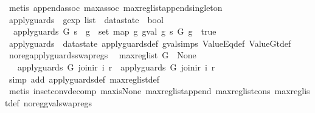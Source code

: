 \begin{isabellebody}
\ {\isacharparenleft}metis\ append{\isacharunderscore}assoc\ max{\isachardot}assoc\ max{\isacharunderscore}reg{\isacharunderscore}list{\isacharunderscore}append{\isacharunderscore}singleton{\isacharparenright}\isanewline
{}\isamarkupfalse%
%
\endisatagproof
{\isafoldproof}%
%
\isadelimproof
\isanewline
%
\endisadelimproof
\isanewline
{}\isamarkupfalse%
\ apply{\isacharunderscore}guards\ {\isacharcolon}{\isacharcolon}\ {\isachardoublequoteopen}gexp\ list\ {\isasymRightarrow}\ datastate\ {\isasymRightarrow}\ bool{\isachardoublequoteclose}\ \isanewline
\ \ {\isachardoublequoteopen}apply{\isacharunderscore}guards\ G\ s\ {\isacharequal}\ {\isacharparenleft}{\isasymforall}g\ {\isasymin}\ set\ {\isacharparenleft}map\ {\isacharparenleft}{\isasymlambda}g{\isachardot}\ gval\ g\ s{\isacharparenright}\ G{\isacharparenright}{\isachardot}\ g\ {\isacharequal}\ true{\isacharparenright}{\isachardoublequoteclose}\isanewline
\isanewline
{}\isamarkupfalse%
\ apply{\isacharunderscore}guards\ {\isacharequal}\ datastate\ apply{\isacharunderscore}guards{\isacharunderscore}def\ gval{\isachardot}simps\ ValueEq{\isacharunderscore}def\ ValueGt{\isacharunderscore}def\isanewline
\isanewline
{}\isamarkupfalse%
\ no{\isacharunderscore}reg{\isacharunderscore}apply{\isacharunderscore}guards{\isacharunderscore}swap{\isacharunderscore}regs{\isacharcolon}\isanewline
\ \ {\isachardoublequoteopen}max{\isacharunderscore}reg{\isacharunderscore}list\ G\ {\isacharequal}\ None\ {\isasymLongrightarrow}\isanewline
\ \ \ apply{\isacharunderscore}guards\ G\ {\isacharparenleft}join{\isacharunderscore}ir\ i\ r{\isacharparenright}\ {\isacharequal}\ apply{\isacharunderscore}guards\ G\ {\isacharparenleft}join{\isacharunderscore}ir\ i\ r{\isacharprime}{\isacharparenright}{\isachardoublequoteclose}\isanewline
%
\isadelimproof
\ \ %
\endisadelimproof
%
\isatagproof
{}\isamarkupfalse%
\ {\isacharparenleft}simp\ add{\isacharcolon}\ apply{\isacharunderscore}guards{\isacharunderscore}def\ max{\isacharunderscore}reg{\isacharunderscore}list{\isacharunderscore}def{\isacharparenright}\isanewline
\ \ \isamarkupfalse%
\ {\isacharparenleft}metis\ in{\isacharunderscore}set{\isacharunderscore}conv{\isacharunderscore}decomp\ max{\isacharunderscore}is{\isacharunderscore}None\ max{\isacharunderscore}reg{\isacharunderscore}list{\isacharunderscore}append\ max{\isacharunderscore}reg{\isacharunderscore}list{\isacharunderscore}cons\ max{\isacharunderscore}reg{\isacharunderscore}list{\isacharunderscore}def\ no{\isacharunderscore}reg{\isacharunderscore}gval{\isacharunderscore}swap{\isacharunderscore}regs{\isacharparenright}%

\end{isabellebody}
